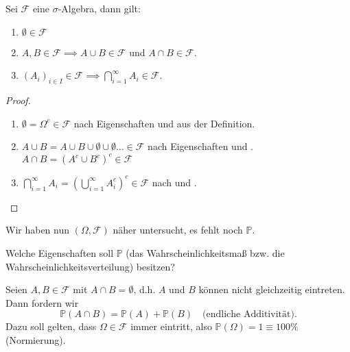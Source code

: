 \begin{lemma}\label{lm:weitere-eigenschaften-einer-sigma-algebra}
    Sei $\mathcal{F}$ eine $\sigma$-Algebra, dann gilt:
    \begin{enumerate}[label=\protect\circled{\alph*}]
        \item $\emptyset\in \mathcal{F}$
        \item $A,B \in \mathcal{F} \implies A \cup B \in \mathcal{F}$ und $A\cap B \in \mathcal{F}$.
        \item $(A_i)_{i \in I}\in \mathcal{F} \implies \bigcap_{i=1}^{\infty}A_i \in \mathcal{F}$.
    \end{enumerate}
\end{lemma}
\begin{proof}
    \begin{enumerate}[label=\protect\circled{\alph*}]
        \item $\emptyset = \Omega^{c} \in \mathcal{F}$ nach Eigenschaften  und  aus der Definition.
        \item $A \cup B = A \cup B \cup \emptyset \cup \emptyset \ldots \in \mathcal{F}$ nach Eigenschaften   und . $A \cap B = (A^{c}\cup B ^{c})^{c} \in \mathcal{F}$
        \item $\bigcap_{i=1}^{\infty}A_i = \left( \bigcup_{i=1}^{\infty}A_i^{c} \right) ^{c}\in \mathcal{F}$ nach  und .
    \end{enumerate}
\end{proof}

Wir haben nun $(\Omega, \mathcal{F})$ näher untersucht, es fehlt noch $\mathbb{P}$. 
\begin{question}
    Welche Eigenschaften soll $\mathbb{P}$ (das Wahrscheinlichkeitsmaß bzw. die Wahrscheinlichkeitsverteilung) besitzen?
\end{question}
Seien $A,B \in \mathcal{F}$ mit $A\cap B = \emptyset$, d.h. $A$ und $B$ können nicht gleichzeitig eintreten. Dann fordern wir
\[
    \mathbb{P}(A \cap B) = \mathbb{P}(A) + \mathbb{P}(B) \quad \text{(endliche Additivität)}
.\] 
Dazu soll gelten, dass $\Omega \in \mathcal{F}$ immer eintritt, also $\mathbb{P}(\Omega) = 1 \equiv  100\%$ (Normierung).

